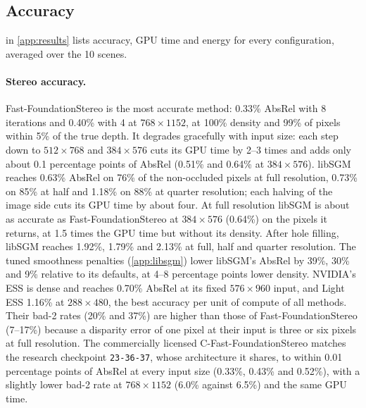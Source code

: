 \documentclass[10pt,twocolumn]{article}
\begin{document}
\subsection{Accuracy}
\label{sec:accuracy}
 in \cref{app:results} lists accuracy, GPU time and energy for every configuration,
averaged over the 10 scenes.


\paragraph{Stereo accuracy.} Fast-FoundationStereo is the most accurate method: 0.33\% AbsRel with
8 iterations and 0.40\% with 4 at $768\times1152$, at 100\% density and 99\% of pixels within 5\% of
the true depth. It degrades gracefully with input size: each step down to $512\times768$ and
$384\times576$ cuts its GPU time by 2--3 times and adds only about 0.1 percentage points of AbsRel
(0.51\% and 0.64\% at $384\times576$). libSGM reaches 0.63\% AbsRel on 76\% of the non-occluded pixels
at full resolution, 0.73\% on 85\% at half and 1.18\% on 88\% at quarter resolution; each halving of
the image side cuts its GPU time by about four. At full resolution libSGM is about as accurate as
Fast-FoundationStereo at $384\times576$ (0.64\%) on the pixels it returns, at 1.5 times the GPU time
but without its density. After hole filling, libSGM reaches 1.92\%, 1.79\% and 2.13\% at full, half
and quarter resolution. The tuned smoothness penalties (\cref{app:libsgm}) lower libSGM's AbsRel by
39\%, 30\% and 9\% relative to its defaults, at 4--8 percentage points lower density. NVIDIA's ESS is
dense and reaches 0.70\% AbsRel at its fixed $576\times960$ input, and Light ESS 1.16\% at
$288\times480$, the best accuracy per unit of compute of all methods. Their bad-2 rates (20\% and
37\%) are higher than those of Fast-FoundationStereo (7--17\%) because a disparity error of one pixel at
their input is three or six pixels at full resolution. The commercially licensed
C-Fast-FoundationStereo matches the research checkpoint \texttt{23-36-37}, whose architecture it shares,
to within 0.01 percentage points of AbsRel at every input size (0.33\%, 0.43\% and 0.52\%), with a
slightly lower bad-2 rate at $768\times1152$ (6.0\% against 6.5\%) and the same GPU time.
\end{document}

